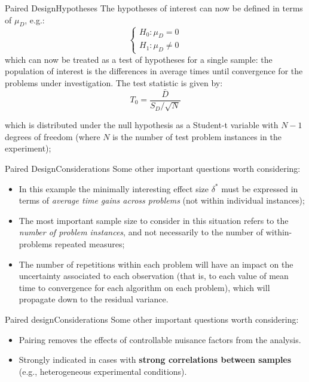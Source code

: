\begin{frame}{Paired Design}{Hypotheses}
The hypotheses of interest can now be defined in terms of $\mu_D$, e.g.:
\begin{equation*}\begin{cases}
H_0: \mu_D = 0\\
H_1: \mu_D \neq 0
\end{cases}\end{equation*}
\noindent which can now be treated as a test of hypotheses for a single sample: the population of interest is the differences in average times until convergence for the problems under investigation. The test statistic is given by:
\begin{equation*} T_0 = \frac{\bar{D}}{S_D/\sqrt{N}}\end{equation*}
\bigskip

which is distributed under the null hypothesis as a Student-t variable with $N-1$ degrees of freedom (where $N$ is the number of test problem instances in the experiment);
\end{frame}


\begin{frame}{Paired Design}{Considerations}
Some other important questions worth considering:
\medskip

\begin{itemize}
\item In this example the minimally interesting effect size $\delta^*$ must be expressed in terms of \textit{average time gains across problems} (not within individual instances);
\item The most important sample size to consider in this situation refers to the \textit{number of problem instances}, and not necessarily to the number of within-problems repeated measures;
\item The number of repetitions within each problem will have an impact on the uncertainty associated to each observation (that is, to each value of mean time to convergence for each algorithm on each problem), which will propagate down to the residual variance.
\end{itemize}
\end{frame}



\begin{frame}{Paired design}{Considerations}
Some other important questions worth considering:
\bigskip

\begin{itemize}
  \item Pairing removes the effects of controllable nuisance factors from the analysis.

  \item Strongly indicated in cases with {\bf strong correlations between samples} (e.g., heterogeneous experimental conditions).
\end{itemize}
\end{frame}

